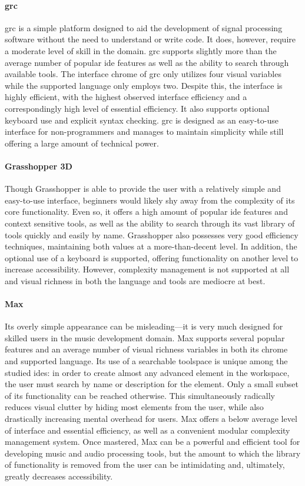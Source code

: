 \paragraph{\acl{grc}} \ac{grc} is a simple platform designed to aid the
development of signal processing software without the need to understand or
write code. It does, however, require a moderate level of skill in the
domain. \ac{grc} supports slightly more than the average number of popular
\ac{ide} features as well as the ability to search through available tools.
The interface chrome of \ac{grc} only utilizes four visual variables while
the supported language only employs two. Despite this, the interface is
highly efficient, with the highest observed interface efficiency and a
correspondingly high level of essential efficiency. It also supports
optional keyboard use and explicit syntax checking. \ac{grc} is designed as
an easy-to-use interface for non-programmers and manages to maintain
simplicity while still offering a large amount of technical power.

\paragraph{Grasshopper 3D} Though Grasshopper is able to provide the user
with a relatively simple and easy-to-use interface, beginners would likely
shy away from the complexity of its core functionality. Even so, it offers
a high amount of popular \ac{ide} features and context sensitive tools, as
well as the ability to search through its vast library of tools quickly and
easily by name. Grasshopper also possesses very good efficiency techniques,
maintaining both values at a more-than-decent level. In addition, the
optional use of a keyboard is supported, offering functionality on another
level to increase accessibility. However, complexity management is not
supported at all and visual richness in both the language and tools are
mediocre at best.

\paragraph{Max} Its overly simple appearance can be misleading---it is very
much designed for skilled users in the music development domain. Max
supports several popular features and an average number of visual richness
variables in both its chrome and supported language. Its use of a
searchable toolspace is unique among the studied \acp{ide}: in order to
create almost any advanced element in the workspace, the user must search
by name or description for the element. Only a small subset of its
functionality can be reached otherwise. This simultaneously radically
reduces visual clutter by hiding most elements from the user, while also
drastically increasing mental overhead for users. Max offers a below
average level of interface and essential efficiency, as well as a
convenient modular complexity management system. Once mastered, Max can be
a powerful and efficient tool for developing music and audio processing
tools, but the amount to which the library of functionality is removed from
the user can be intimidating and, ultimately, greatly decreases
accessibility.

